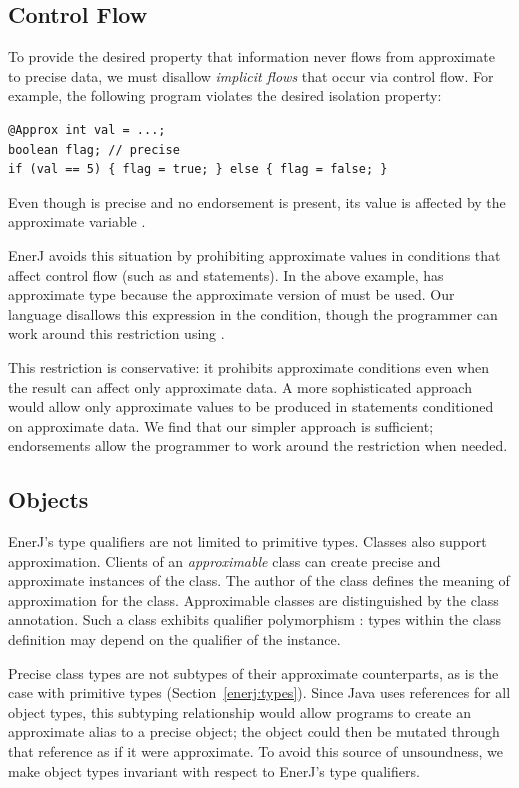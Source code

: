 \subsection{Control Flow}
To provide the desired property that information never flows from
approximate to precise data, we must disallow \emph{implicit flows} that occur
via control flow. For example, the following program
violates the desired isolation property:
\begin{lstlisting}
@Approx int val = ...;
boolean flag; // precise
if (val == 5) { flag = true; } else { flag = false; }
\end{lstlisting}
Even though  is precise and no endorsement is
present, its value is affected by the approximate variable .

EnerJ avoids this situation by prohibiting approximate values in
conditions that affect control flow (such as  and
 statements).
In the
above example,  has approximate type
because the approximate version of \ilcode{==} must be used. Our
language disallows this expression in the condition, though the
programmer can work around this restriction using
.

This restriction is conservative: it prohibits approximate conditions even
when the result can affect only approximate data. A more sophisticated
approach would allow only approximate values to be produced in statements
conditioned on approximate data. We find that our simpler approach
is sufficient; endorsements allow the programmer to work around the
restriction when needed.

\subsection{Objects}
\label{enerj:objects}
EnerJ's type qualifiers are not limited to primitive types.
Classes also support approximation.
Clients of an \emph{approximable} class can create
precise and approximate instances of the class. The author of the
class defines the meaning of approximation for the class.
Approximable classes are distinguished by the 
class annotation. Such a class exhibits qualifier polymorphism
\cite{qualifiers}: types within the class definition
may depend on the qualifier of the instance.

Precise class types are not subtypes of their approximate
counterparts, as is the case with primitive types (Section~\ref{enerj:types}).
Since Java uses references for all object types, this subtyping relationship
would allow programs to create an approximate alias to a precise object;
the object could then be mutated through that reference as if it were
approximate.
To avoid this source of unsoundness, we make object types invariant with
respect to EnerJ's type qualifiers.

